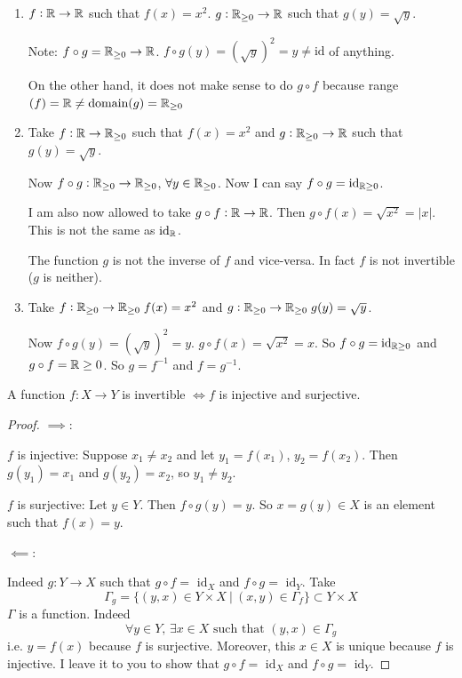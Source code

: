 \documentclass[10pt]{scrartcl}
\begin{document}
\begin{examples}
\begin{enumerate}
\item $f: \mathbb{R} \to \mathbb{R}$ such that $f(x) = x^2$. $g: \mathbb{R}_{\geq 0} \to \mathbb{R}$ such that $g(y) = \sqrt{y}$. 

Note: $f \circ g = \mathbb{R}_{\geq 0} \to \mathbb{R}$. $f \circ g(y) = (\sqrt{y})^2 = y \neq \text{id}$ of anything. 

On the other hand, it does not make sense to do $g \circ f$ because range$(f) = \mathbb{R} \neq \text{domain}(g) = \mathbb{R}_{\geq 0}$\\

\item Take  $f: \mathbb{R} \to \mathbb{R}_{\geq 0}$ such that $f(x) = x^2$ and $g: \mathbb{R}_{\geq 0} \to \mathbb{R}$ such that $g(y) = \sqrt{y}$.

Now $f\circ g : \mathbb{R}_{\geq 0} \to \mathbb{R}_{\geq 0}$, $\forall y \in \mathbb{R}_{\geq 0}$. Now I can say $f \circ g = \mathrm{id}_{\mathbb{R} \geq 0}$. 

I am also now allowed to take $g \circ f: \mathbb{R} \to \mathbb{R}$. Then $g\circ f(x) = \sqrt{x^2}= |x|$. This is not the same as $\mathrm{id}_{\mathbb{R}}$. 

The function $g$ is not the inverse of $f$ and vice-versa. In fact $f$ is not invertible ($g$ is neither).

\item Take $f: \mathbb{R}_{\geq 0} \to \mathbb{R}_{\geq 0}\; f(x) = x^2$ and $g: \mathbb{R}_{\geq 0} \to \mathbb{R}_{\geq 0}\; g(y) = \sqrt{y}$. 

Now $f \circ g (y) = (\sqrt{y})^2 = y$. $g \circ f(x) = \sqrt{x^2}=x$. So $f\circ g = \mathrm{id}_{\mathbb{R} \geq 0}$ and $g \circ f = \mathrm{\mathbb{R} \geq 0}$. So $g = f^{-1}$ and $f = g^{-1}$. 
\end{enumerate}
\end{examples}


\begin{theorem}
A function $f: X \to Y$ is invertible $\iff f$ is injective and surjective. 	
\end{theorem}

\begin{proof} $\implies$:

$f$ is injective: Suppose $x_1 \neq x_2$ and let $y_1 = f(x_1)$, $y_2 = f(x_2)$. Then $g(y_1) = x_1$ and $g(y_2) = x_2$, so $y_1 \neq y_2$. 

$f$ is surjective: Let $y \in Y$. Then $f \circ g(y) = y$. So $x = g(y) \in X$ is an element such that $f(x) = y$. 

$\impliedby:$

Indeed $g: Y \to X$ such that $g \circ f = \text{ id}_X$ and $f \circ g = \text{ id}_Y$. Take 
\[\Gamma_g = \{(y,x) \in Y \times X ~|~ (x,y) \in \Gamma_f \} \subset Y \times X\]	
$\Gamma$ is a function. Indeed
\[\forall y \in Y,\, \exists x \in X\text{ such that } (y,x) \in \Gamma_g\]
i.e. $y = f(x)$ because $f$ is surjective. Moreover, this $x \in X$ is unique because $f$ is injective. I leave it to you to show that $g \circ f =\text{ id}_X$ and $f\circ g = \text{ id}_Y$. 
\end{proof}\vsp
\end{document}
